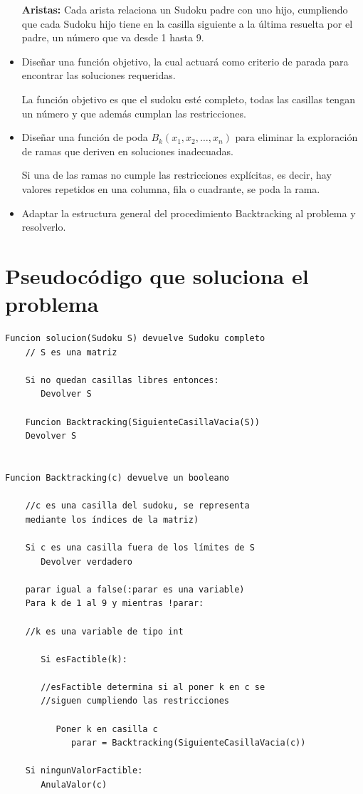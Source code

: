 \documentclass[11pt, a4paper]{article}
\theoremstyle{theorem-style}
\theoremstyle{definition-style}
\theoremstyle{remark-style}
\theoremstyle{example-style}
\begin{document}
\begin{itemize}
\textbf{Aristas: }Cada arista relaciona un Sudoku padre con uno hijo, cumpliendo que cada Sudoku hijo tiene en la casilla siguiente a la última resuelta por el padre, un número que va desde 1 hasta 9.

\item Diseñar una función objetivo, la cual actuará como criterio de parada para encontrar las soluciones requeridas.

La función objetivo es que el sudoku esté completo, todas las casillas tengan un número y que además cumplan las restricciones.


\item Diseñar una función de poda $B_k(x_1, x_2, \ldots, x_n)$ para eliminar la exploración de ramas que deriven en soluciones inadecuadas.

Si una de las ramas no cumple las restricciones explícitas, es decir, hay valores
repetidos en una columna, fila o cuadrante, se poda la rama.

\item Adaptar la estructura general del procedimiento Backtracking al problema y resolverlo.

\end{itemize}

\section{Pseudocódigo que soluciona el problema}

\begin{verbatim}
Funcion solucion(Sudoku S) devuelve Sudoku completo
    // S es una matriz
    
    Si no quedan casillas libres entonces:
       Devolver S
   
    Funcion Backtracking(SiguienteCasillaVacia(S))
    Devolver S
    
    
Funcion Backtracking(c) devuelve un booleano

    //c es una casilla del sudoku, se representa
    mediante los índices de la matriz)
    
    Si c es una casilla fuera de los límites de S
       Devolver verdadero
    
    parar igual a false(:parar es una variable)
    Para k de 1 al 9 y mientras !parar:
    
    //k es una variable de tipo int
    
       Si esFactible(k): 
       
       //esFactible determina si al poner k en c se 
       //siguen cumpliendo las restricciones
       
          Poner k en casilla c
             parar = Backtracking(SiguienteCasillaVacia(c))
       
    Si ningunValorFactible:
       AnulaValor(c)    
\end{verbatim}
\end{document}
